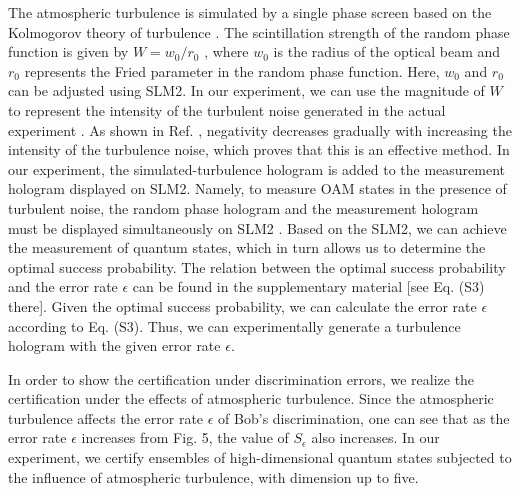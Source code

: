 \documentclass[letterpaper,preprint,superscriptaddress,floatfix,showpacs]{revtex4}
\begin{document}
The atmospheric turbulence is simulated by a single phase screen based on the Kolmogorov theory of turbulence \cite{43, 44}. The scintillation strength of the random phase function is given by $W=w_{0}/r_{0}$ \cite{43}, where $w_{0}$ is the radius of the optical beam and $r_{0}$ represents the Fried parameter in the random phase function. Here, $w_{0}$ and $r_{0}$ can be adjusted using SLM2. In our experiment, we can use the magnitude of $W$ to represent the intensity of the turbulent noise generated in the actual experiment \cite{Alpha2014}. As shown in Ref. \cite{43}, negativity decreases gradually with increasing the intensity of the turbulence noise, which proves that this is an effective method. In our experiment, the simulated-turbulence hologram is added to the measurement hologram displayed on SLM2. Namely, to measure OAM states in the presence of turbulent noise, the random phase hologram and the measurement hologram must be displayed simultaneously on SLM2 \cite{Supplemental}. Based on the SLM2, we can achieve the measurement of quantum states, which in turn allows us to determine the optimal success probability. The relation between the optimal success probability and the error rate $\epsilon$ can be found in the supplementary material [see Eq. (S3) there]. Given the optimal success probability, we can calculate the error rate $\epsilon$ according to Eq. (S3). Thus, we can experimentally generate a turbulence hologram with the given error rate $\epsilon$.









In order to show the certification under discrimination errors, we realize the certification under the effects of atmospheric turbulence. Since the atmospheric turbulence affects the error rate $\epsilon$ of Bob's discrimination, one can see that as the error rate $\epsilon$ increases from Fig. 5, the value of $S_{\epsilon}$ also increases. In our experiment, we certify ensembles of high-dimensional quantum states subjected to the influence of atmospheric turbulence, with dimension up to five.
\end{document}
